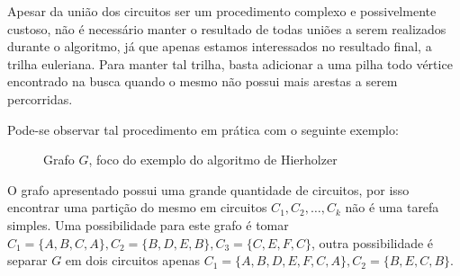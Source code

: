 Apesar da união dos circuitos ser um procedimento complexo e possivelmente custoso, não é necessário manter o resultado de todas uniões a serem realizados durante o algoritmo, já que apenas estamos interessados no resultado final, a trilha euleriana.
Para manter tal trilha, basta adicionar a uma pilha todo vértice encontrado na busca quando o mesmo não possui mais arestas a serem percorridas.

Pode-se observar tal procedimento em prática com o seguinte exemplo:

\begin{figure}[H]
    \center
    \caption{Grafo $G$, foco do exemplo do algoritmo de Hierholzer}
\end{figure}

\sloppy O grafo apresentado possui uma grande quantidade de circuitos, por isso encontrar uma partição do mesmo em circuitos $C_1, C_2, \dots, C_k$ não é uma tarefa simples.
Uma possibilidade para este grafo é tomar $C_1 = \{A, B, C, A\}, C_2 = \{B, D, E, B\}, C_3 = \{C, E, F, C\}$, outra possibilidade é separar $G$ em dois circuitos apenas $C_1 = \{A, B, D, E, F, C, A\}, C_2 = \{B, E, C, B\}$.

